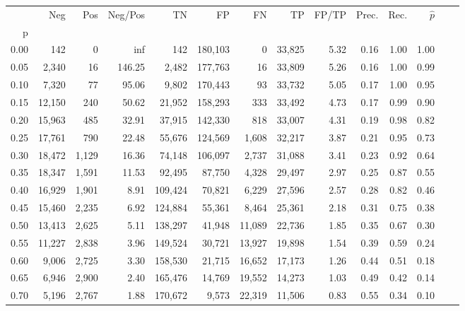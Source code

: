 \begin{tabular}{rrrrrrrrrrrrrr}
\toprule
{} &     Neg &    Pos & Neg/Pos &       TN &       FP &      FN &      TP & FP/TP & Prec. &  Rec. & $\hat{p}$ \\
p    &         &        &         &          &          &         &         &       &       &       &           \\
\midrule
0.00 &     142 &      0 &     inf &      142 &  180,103 &       0 &  33,825 &  5.32 &  0.16 &  1.00 &      1.00 \\
0.05 &   2,340 &     16 &  146.25 &    2,482 &  177,763 &      16 &  33,809 &  5.26 &  0.16 &  1.00 &      0.99 \\
0.10 &   7,320 &     77 &   95.06 &    9,802 &  170,443 &      93 &  33,732 &  5.05 &  0.17 &  1.00 &      0.95 \\
0.15 &  12,150 &    240 &   50.62 &   21,952 &  158,293 &     333 &  33,492 &  4.73 &  0.17 &  0.99 &      0.90 \\
0.20 &  15,963 &    485 &   32.91 &   37,915 &  142,330 &     818 &  33,007 &  4.31 &  0.19 &  0.98 &      0.82 \\
0.25 &  17,761 &    790 &   22.48 &   55,676 &  124,569 &   1,608 &  32,217 &  3.87 &  0.21 &  0.95 &      0.73 \\
0.30 &  18,472 &  1,129 &   16.36 &   74,148 &  106,097 &   2,737 &  31,088 &  3.41 &  0.23 &  0.92 &      0.64 \\
0.35 &  18,347 &  1,591 &   11.53 &   92,495 &   87,750 &   4,328 &  29,497 &  2.97 &  0.25 &  0.87 &      0.55 \\
0.40 &  16,929 &  1,901 &    8.91 &  109,424 &   70,821 &   6,229 &  27,596 &  2.57 &  0.28 &  0.82 &      0.46 \\
0.45 &  15,460 &  2,235 &    6.92 &  124,884 &   55,361 &   8,464 &  25,361 &  2.18 &  0.31 &  0.75 &      0.38 \\
0.50 &  13,413 &  2,625 &    5.11 &  138,297 &   41,948 &  11,089 &  22,736 &  1.85 &  0.35 &  0.67 &      0.30 \\
0.55 &  11,227 &  2,838 &    3.96 &  149,524 &   30,721 &  13,927 &  19,898 &  1.54 &  0.39 &  0.59 &      0.24 \\
0.60 &   9,006 &  2,725 &    3.30 &  158,530 &   21,715 &  16,652 &  17,173 &  1.26 &  0.44 &  0.51 &      0.18 \\
0.65 &   6,946 &  2,900 &    2.40 &  165,476 &   14,769 &  19,552 &  14,273 &  1.03 &  0.49 &  0.42 &      0.14 \\
0.70 &   5,196 &  2,767 &    1.88 &  170,672 &    9,573 &  22,319 &  11,506 &  0.83 &  0.55 &  0.34 &      0.10 \\

\end{tabular}
